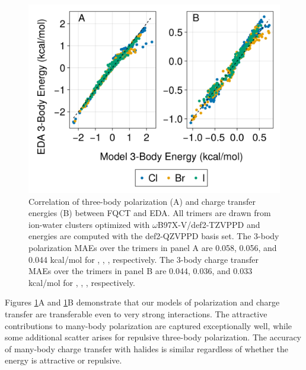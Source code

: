 \documentclass[journal=jacsat,manuscript=article]{achemso}
\begin{document}
\begin{figure}[h]
  \includegraphics*[width=\textwidth]{figures/three_body_pol_and_ct_halides.png}
  \caption{Correlation of three-body polarization (A) and charge transfer energies (B)
  between FQCT and EDA. All trimers are drawn from ion-water clusters optimized
  with $\omega$B97X-V/def2-TZVPPD and energies are computed with the def2-QZVPPD basis set.
  The 3-body polarization MAEs over the trimers in panel A are 0.058, 0.056, and 0.044 kcal/mol
  for , , , respectively. The 3-body charge transfer MAEs over
  the trimers in panel B are 0.044, 0.036, and 0.033 kcal/mol
  for , , , respectively.
}
  \label{fig:halide_3b}
\end{figure}

Figures \ref{fig:halide_3b}A and \ref{fig:halide_3b}B demonstrate that our models of polarization and charge transfer are transferable even to very strong interactions. The attractive contributions to many-body polarization are captured exceptionally well, while some additional scatter arises for repulsive three-body polarization. The accuracy of many-body charge transfer with halides is similar regardless of whether the energy is attractive or repulsive. 
\end{document}

